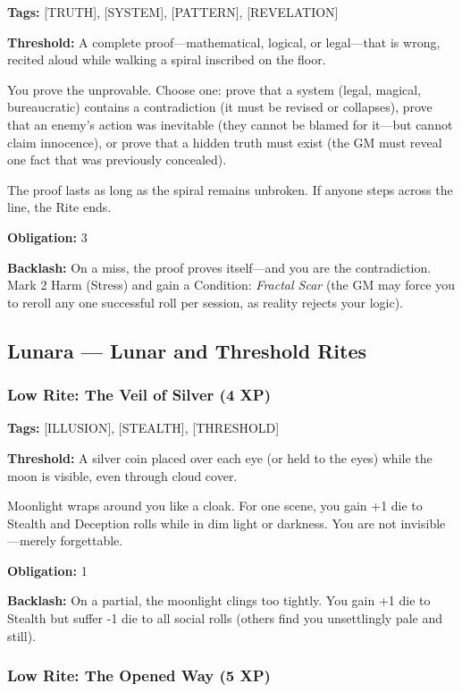 \textbf{Tags:} [TRUTH], [SYSTEM], [PATTERN], [REVELATION]

\textbf{Threshold:} A complete proof—mathematical, logical, or legal—that is wrong, recited aloud while walking a spiral inscribed on the floor.

You prove the unprovable. Choose one: prove that a system (legal, magical, bureaucratic) contains a contradiction (it must be revised or collapses), prove that an enemy's action was inevitable (they cannot be blamed for it—but cannot claim innocence), or prove that a hidden truth must exist (the GM must reveal one fact that was previously concealed).

The proof lasts as long as the spiral remains unbroken. If anyone steps across the line, the Rite ends.

\textbf{Obligation:} 3

\textbf{Backlash:} On a miss, the proof proves itself—and you are the contradiction. Mark 2 Harm (Stress) and gain a Condition: \textit{Fractal Scar} (the GM may force you to reroll any one successful roll per session, as reality rejects your logic).

\subsection{Lunara — Lunar and Threshold Rites}

\subsubsection{Low Rite: The Veil of Silver (4 XP)}

\textbf{Tags:} [ILLUSION], [STEALTH], [THRESHOLD]

\textbf{Threshold:} A silver coin placed over each eye (or held to the eyes) while the moon is visible, even through cloud cover.

Moonlight wraps around you like a cloak. For one scene, you gain +1 die to Stealth and Deception rolls while in dim light or darkness. You are not invisible—merely forgettable.

\textbf{Obligation:} 1

\textbf{Backlash:} On a partial, the moonlight clings too tightly. You gain +1 die to Stealth but suffer -1 die to all social rolls (others find you unsettlingly pale and still).

\subsubsection{Low Rite: The Opened Way (5 XP)}

